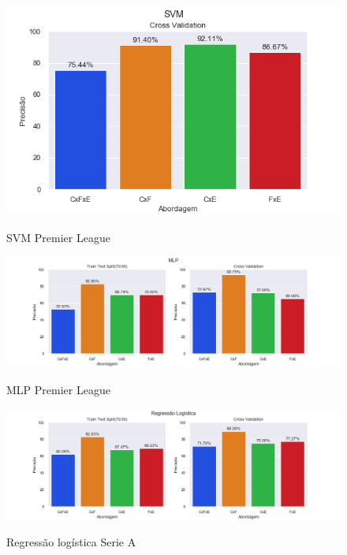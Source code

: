 \begin{figure}[htbp]
  \begin{center}
  \includegraphics[width=0.7\linewidth]{imagens/resultados/svm_pl.png}\\
  \end{center}
  \caption[SVM Premier League]{SVM Premier League}
  \label{fig:logo}
\end{figure}

\begin{figure}[htbp]
  \begin{center}
  \includegraphics[width=1.05\linewidth]{imagens/resultados/mlp_pl.png}\\
  \end{center}
  \caption[MLP Premier League]{MLP Premier League}
  \label{fig:logo}
\end{figure}
	
\begin{figure}[htbp]
  \begin{center}
  \includegraphics[width=1.05\linewidth]{imagens/resultados/regressao_logistica_sa.png}\\
  \end{center}
  \caption[Regressão logística Serie A]{Regressão logística Serie A}
  \label{fig:logo}
\end{figure}


